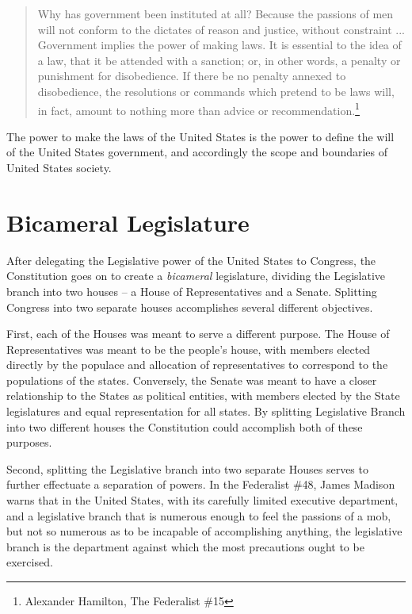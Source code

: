 \begin{quote}
Why has government been instituted at all? Because the passions of men will not conform to the dictates of reason and justice, without constraint ... 
Government implies the power of making laws. It is essential to the idea of a law, that it be attended with a sanction; or, in other words, a penalty or punishment for disobedience. If there be no penalty annexed to disobedience, the resolutions or commands which pretend to be laws will, in fact, amount to nothing more than advice or recommendation.\footnote{Alexander Hamilton, The Federalist \#15}
\end{quote}

The power to make the laws of the United States is the power to define the will of the United States government, and accordingly the scope and boundaries of United States society.

\section{Bicameral Legislature}
After delegating the Legislative power of the United States to Congress, the Constitution goes on to create a \textit{bicameral} legislature, dividing the Legislative branch into two houses -- a House of Representatives and a Senate.  Splitting Congress into two separate houses accomplishes several different objectives.

First, each of the Houses was meant to serve a different purpose.  The House of Representatives was meant to be the people's house, with members elected directly by the populace and allocation of representatives to correspond to the populations of the states.  Conversely, the Senate was meant to have a closer relationship to the States as political entities, with members elected by the State legislatures and equal representation for all states.  By splitting Legislative Branch into two different houses the Constitution could accomplish both of these purposes.

Second, splitting the Legislative branch into two separate Houses serves to further effectuate a separation of powers.  In the Federalist \#48, James Madison warns that in the United States, with its carefully limited executive department, and a legislative branch that is numerous enough to feel the passions of a mob, but not so numerous as to be incapable of accomplishing anything, the legislative branch is the department against which the most precautions ought to be exercised.

